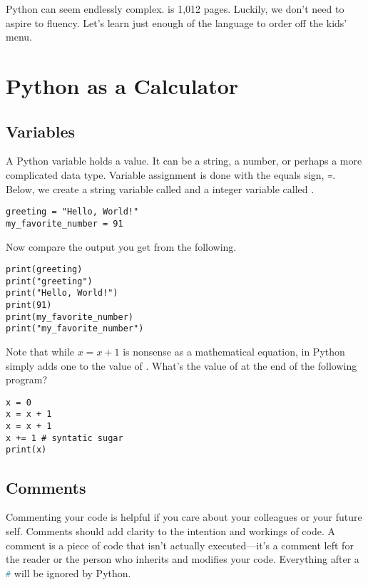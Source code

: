 \documentclass{article}
\begin{document}
Python can seem endlessly complex.  is 1,012 pages. Luckily, we don't need to aspire to fluency. Let's learn just enough of the language to order off the kids' menu. 


\section{Python as a Calculator}

\subsection{Variables}

A Python variable holds a value. It can be a string, a number, or perhaps a more complicated data type. Variable assignment is done with the equals sign, \lstinline[language = Python]{=}. Below, we create a string variable called  and a integer variable called . 

\smallskip

\begin{lstlisting}
greeting = "Hello, World!"
my_favorite_number = 91
\end{lstlisting}

\smallskip
\noindent Now compare the output you get from the following.
\begin{lstlisting}
print(greeting)
print("greeting")
print("Hello, World!")
print(91)
print(my_favorite_number)
print("my_favorite_number")
\end{lstlisting}

\noindent Note that while $x = x+1$ is nonsense as a mathematical equation, in Python  simply adds one to the value of . What's the value of  at the end of the following program? 

\begin{lstlisting}
x = 0
x = x + 1 
x = x + 1
x += 1 # syntatic sugar
print(x)
\end{lstlisting}

\subsection{Comments}
Commenting your code is helpful if you care about your colleagues or your future self. Comments should add clarity to the intention and workings of code. A comment is a piece of code that isn't actually executed---it's a comment left for the reader or the person who inherits and modifies your code.
Everything after a \lstinline[language = Python]{#} will be ignored by Python.
\end{document}
